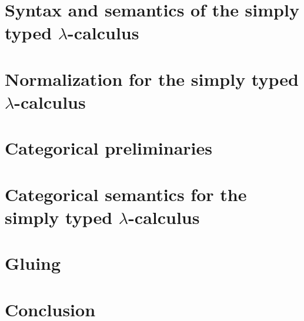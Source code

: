 \documentclass{report}
\begin{document}
\chapter{Syntax and semantics of the simply typed \texorpdfstring{$\lambda$}{lambda}-calculus} \label{chap:stlc}


\chapter{Normalization for the simply typed \texorpdfstring{$\lambda$}{lambda}-calculus} \label{chap:norm-stlc}


\chapter{Categorical preliminaries} \label{chap:cat-prelims}


\chapter{Categorical semantics for the simply typed \texorpdfstring{$\lambda$}{lambda}-calculus} \label{chap:stlc-cat}


\chapter{Gluing} \label{chap:gluing}


\chapter{Conclusion}





\end{document}
